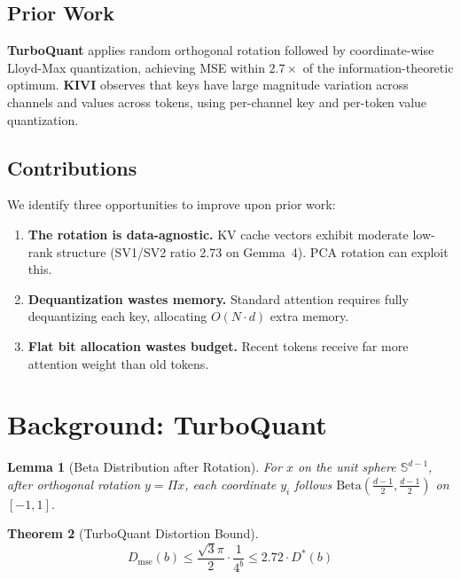 \documentclass[10pt,twocolumn]{article}
\newtheorem{theorem}{Theorem}
\newtheorem{lemma}[theorem]{Lemma}
\begin{document}
\subsection{Prior Work}

\textbf{TurboQuant} \citep{zandieh2025turboquant} applies random orthogonal rotation followed by coordinate-wise Lloyd-Max quantization, achieving MSE within $2.7\times$ of the information-theoretic optimum. \textbf{KIVI} \citep{liu2024kivi} observes that keys have large magnitude variation across channels and values across tokens, using per-channel key and per-token value quantization.

\subsection{Contributions}

We identify three opportunities to improve upon prior work:
\begin{enumerate}[nosep]
\item \textbf{The rotation is data-agnostic.} KV cache vectors exhibit moderate low-rank structure (SV1/SV2 ratio 2.73 on Gemma~4). PCA rotation can exploit this.
\item \textbf{Dequantization wastes memory.} Standard attention requires fully dequantizing each key, allocating $O(N \cdot d)$ extra memory.
\item \textbf{Flat bit allocation wastes budget.} Recent tokens receive far more attention weight than old tokens.
\end{enumerate}

\section{Background: TurboQuant}

\begin{lemma}[Beta Distribution after Rotation]
For $x$ on the unit sphere $\mathbb{S}^{d-1}$, after orthogonal rotation $y = \Pi x$, each coordinate $y_i$ follows $\text{Beta}(\frac{d-1}{2}, \frac{d-1}{2})$ on $[-1, 1]$.
\end{lemma}

\begin{theorem}[TurboQuant Distortion Bound]
\begin{equation}
D_{\text{mse}}(b) \leq \frac{\sqrt{3}\pi}{2} \cdot \frac{1}{4^b} \leq 2.72 \cdot D^*(b)
\end{equation}
\end{theorem}
\end{document}
